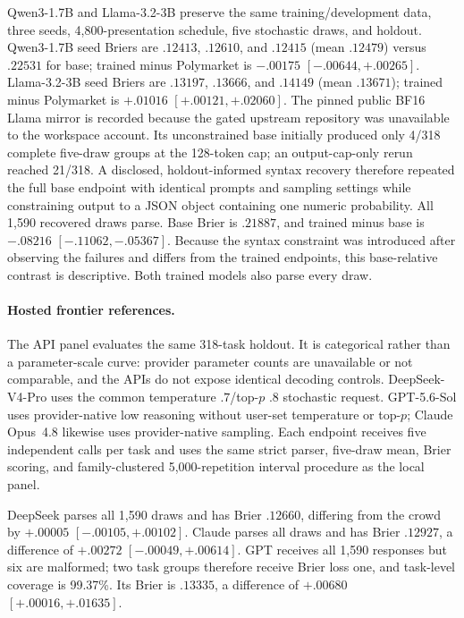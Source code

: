 Qwen3-1.7B and Llama-3.2-3B preserve the same training/development data, three
seeds, 4,800-presentation schedule, five stochastic draws, and holdout.
Qwen3-1.7B seed Briers are $.12413$, $.12610$, and
$.12415$ (mean $.12479$) versus $.22531$ for base; trained minus Polymarket is
$-.00175$ $[-.00644,+.00265]$. Llama-3.2-3B seed Briers are $.13197$, $.13666$,
and $.14149$ (mean $.13671$); trained minus Polymarket is $+.01016$
$[+.00121,+.02060]$. The pinned public BF16 Llama mirror is recorded because the gated upstream
repository was unavailable to the workspace account. Its unconstrained base
initially produced only 4/318 complete five-draw groups at the 128-token cap;
an output-cap-only rerun reached 21/318. A disclosed, holdout-informed syntax
recovery therefore repeated the full base endpoint with identical prompts and
sampling settings while constraining output to a JSON object containing one
numeric probability. All 1,590 recovered draws parse. Base Brier is $.21887$,
and trained minus base is $-.08216$ $[-.11062,-.05367]$. Because the syntax
constraint was introduced after observing the failures and differs from the
trained endpoints, this base-relative contrast is descriptive. Both trained
models also parse every draw.

\paragraph{Hosted frontier references.}
The API panel evaluates the same 318-task holdout. It is categorical rather than a parameter-scale
curve: provider parameter counts are unavailable or not comparable, and the
APIs do not expose identical decoding controls. DeepSeek-V4-Pro uses the common
temperature $.7$/top-$p$ $.8$ stochastic request. GPT-5.6-Sol uses provider-native
low reasoning without user-set temperature or top-$p$; Claude Opus~4.8 likewise
uses provider-native sampling. Each endpoint receives five independent calls
per task and uses the same strict parser, five-draw mean, Brier scoring, and
family-clustered 5,000-repetition interval procedure as the local panel.

DeepSeek parses all 1,590 draws and has Brier $.12660$, differing from the crowd by
$+.00005$ $[-.00105,+.00102]$. Claude parses all draws and has Brier $.12927$,
a difference of $+.00272$ $[-.00049,+.00614]$. GPT receives all 1,590
responses but six are malformed; two task groups therefore receive Brier loss
one, and task-level coverage is 99.37\%.
Its Brier is $.13335$, a difference of $+.00680$
$[+.00016,+.01635]$.

